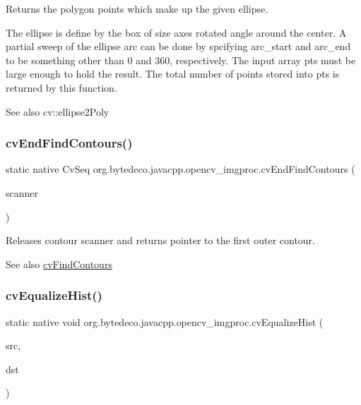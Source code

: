 Returns the polygon points which make up the given ellipse. 

The ellipse is define by the box of size \textquotesingle{}axes\textquotesingle{} rotated \textquotesingle{}angle\textquotesingle{} around the \textquotesingle{}center\textquotesingle{}. A partial sweep of the ellipse arc can be done by spcifying arc\+\_\+start and arc\+\_\+end to be something other than 0 and 360, respectively. The input array \textquotesingle{}pts\textquotesingle{} must be large enough to hold the result. The total number of points stored into \textquotesingle{}pts\textquotesingle{} is returned by this function. \begin{DoxySeeAlso}{See also}
cv\+::ellipse2\+Poly 
\end{DoxySeeAlso}
\mbox{\label{group__imgproc__c_ga79913a8abbec2491176f92da28a62346}} 
\subsubsection{\texorpdfstring{cv\+End\+Find\+Contours()}{cvEndFindContours()}}
{\footnotesize\ttfamily static native Cv\+Seq org.\+bytedeco.\+javacpp.\+opencv\+\_\+imgproc.\+cv\+End\+Find\+Contours (\begin{DoxyParamCaption}\item[{@By\+Ptr\+Ptr Cv\+Contour\+Scanner}]{scanner }\end{DoxyParamCaption})\hspace{0.3cm}{\ttfamily [static]}}



Releases contour scanner and returns pointer to the first outer contour. 

\begin{DoxySeeAlso}{See also}
\hyperlink{group__imgproc__c_gaa4cfb26bdebe22cd9a83d79b429520ee}{cv\+Find\+Contours} 
\end{DoxySeeAlso}
\mbox{\label{group__imgproc__c_gadeca2750f8eaf0fd4c145149f4e0ff00}} 
\subsubsection{\texorpdfstring{cv\+Equalize\+Hist()}{cvEqualizeHist()}}
{\footnotesize\ttfamily static native void org.\+bytedeco.\+javacpp.\+opencv\+\_\+imgproc.\+cv\+Equalize\+Hist (\begin{DoxyParamCaption}\item[{@Const Cv\+Arr}]{src,  }\item[{Cv\+Arr}]{dst }\end{DoxyParamCaption})\hspace{0.3cm}{\ttfamily [static]}}



